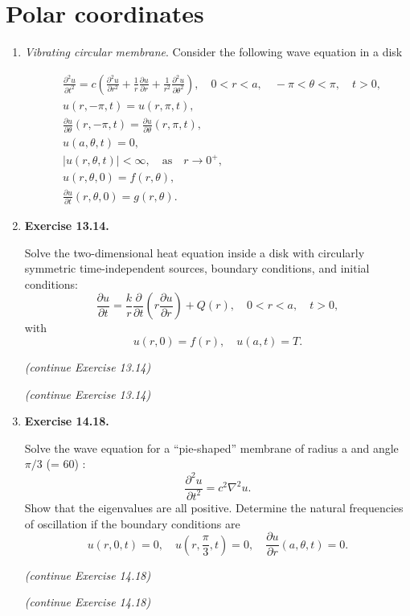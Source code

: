 \newpage

\section{Polar coordinates}

\begin{enumerate}

    \item \textit{Vibrating circular membrane}. Consider the following wave equation in a disk

    \[
    \begin{aligned}
        & \frac{\partial^{2} u}{\partial t^{2}}  = c\left( \frac{\partial^{2} u}{\partial r^{2}} + \frac{1}{r}\frac{\partial u}{\partial r} + \frac{1}{r^{2}}\frac{\partial^{2} u}{\partial \theta^{2}} \right), \quad 0 < r < a, \quad -\pi < \theta < \pi, \quad t>0, \\
        & u(r, -\pi, t) = u(r, \pi, t), \\
        & \frac{\partial u}{\partial \theta}(r, -\pi,t) = \frac{\partial u}{\partial \theta}(r, \pi,t), \\
        & u(a, \theta, t) = 0, \\
        & |u(r,\theta ,t)|<\infty, \quad \text{as} \quad r\to 0^{+},\\
        & u(r,\theta, 0) = f(r,\theta), \\
        & \frac{\partial u}{\partial t} (r, \theta, 0) = g(r, \theta).
    \end{aligned}
    \]

\newpage

\item \textbf{Exercise 13.14.}

Solve the two-dimensional heat equation inside a disk with circularly symmetric time-independent sources, boundary conditions, and initial conditions:
\[\frac{\partial u}{\partial t} = \frac{k}{r}\frac{\partial}{\partial t}\left( r \frac{\partial u}{\partial r} \right) + Q(r) , \quad 0<r<a, \quad t>0,\]
with
\[u(r,0) = f(r), \quad u(a,t)=T.\]

\newpage 

\textit{(continue Exercise 13.14)}

\newpage 

\textit{(continue Exercise 13.14)}

\newpage 

\item \textbf{Exercise 14.18.}

Solve the wave equation for a ``pie-shaped'' membrane of radius a and angle $\pi/3$ (= 60\textdegree) :
\[\frac{\partial ^{2}u}{\partial t^{2}} = c^{2}\nabla ^{2}u.\]
Show that the eigenvalues are all positive. Determine the natural frequencies of oscillation if the boundary conditions are
\[u(r,0,t) = 0, \quad u \left(r, \frac{\pi}{3}, t \right)=0, \quad \frac{\partial u}{\partial r}(a,\theta, t)=0.\]

\newpage 

\textit{(continue Exercise 14.18)}

\newpage 

\textit{(continue Exercise 14.18)}


\end{enumerate}




